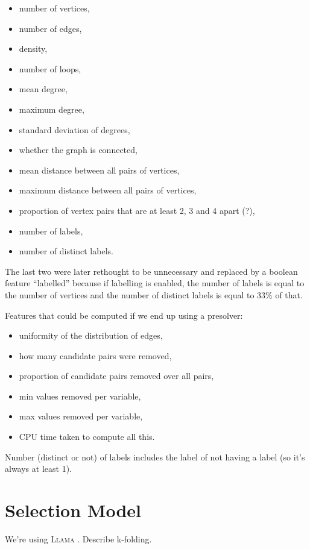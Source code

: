 \documentclass{article}
\begin{document}
\begin{itemize}
\item number of vertices,
\item number of edges,
\item density,
\item number of loops,
\item mean degree,
\item maximum degree,
\item standard deviation of degrees,
\item whether the graph is connected,
\item mean distance between all pairs of vertices,
\item maximum distance between all pairs of vertices,
\item proportion of vertex pairs that are at least 2, 3 and 4 apart (?),
\item number of labels,
\item number of distinct labels.
\end{itemize}

The last two were later rethought to be unnecessary and replaced by a boolean
feature ``labelled'' because if labelling is enabled, the number of labels is equal
to the number of vertices and the number of distinct labels is equal to 33\% of that.

Features that could be computed if we end up using a presolver:

\begin{itemize}
\item uniformity of the distribution of edges,
\item how many candidate pairs were removed,
\item proportion of candidate pairs removed over all pairs,
\item min values removed per variable,
\item max values removed per variable,
\item CPU time taken to compute all this.
\end{itemize}

Number (distinct or not) of labels includes the label of not having a label (so
it's always at least 1).

\section{Selection Model}
We're using \textsc{Llama} \cite{kotthoff_llama_2013}. Describe k-folding.

\printbibliography
\end{document}
